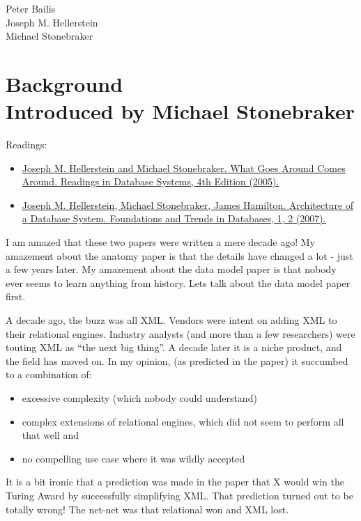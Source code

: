 \documentclass[b5paper,11pt,twoside,openright]{book}
\newcommand\Chapter[3]{
  \hypertarget{#1}{
    \chapter[#2]{#2\\{\Large #3}}\label{#1}
  }
}
\begin{document}
\enlargethispage{2\baselineskip}
Peter Bailis\\
Joseph M. Hellerstein\\
Michael Stonebraker\\


\Chapter{ch1-background}{Background}{%
  Introduced by Michael Stonebraker}

\begin{framed}
Readings:

\begin{itemize}
  \item
  \href{https://scholar.google.com/scholar?cluster=7366182905777149494}{Joseph
    M. Hellerstein and Michael Stonebraker. {What Goes Around Comes Around}.
    {Readings in Database Systems}, 4th Edition (2005).}
  \item
  \href{https://scholar.google.com/scholar?cluster=11466590537214723805}{Joseph
    M. Hellerstein, Michael Stonebraker, James Hamilton. {Architecture of a
      Database System}. {Foundations and Trends in Databases}, 1, 2 (2007).}
\end{itemize}
\end{framed}

I am amazed that these two papers were written a mere decade ago! My
amazement about the anatomy paper is that the details have changed a lot
- just a few years later. My amazement about the data model paper is
that nobody ever seems to learn anything from history. Lets talk about
the data model paper first.

A decade ago, the buzz was all XML. Vendors were intent on adding XML to
their relational engines. Industry analysts (and more than a few
researchers) were touting XML as ``the next big thing''. A decade later
it is a niche product, and the field has moved on. In my opinion, (as
predicted in the paper) it succumbed to a combination of:

\begin{itemize}
  \item
  excessive complexity (which nobody could understand)
  \item
  complex extensions of relational engines, which did not seem to
  perform all that well and
  \item
  no compelling use case where it was wildly accepted
\end{itemize}

It is a bit ironic that a prediction was made in the paper that X would
win the Turing Award by successfully simplifying XML. That prediction
turned out to be totally wrong! The net-net was that relational won and
XML lost.
\end{document}
